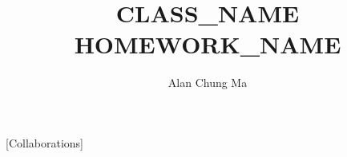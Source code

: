 \documentclass{article}
\title{CLASS_NAME HOMEWORK_NAME}
\author{Alan Chung Ma}
\date{}
\begin{document}
\maketitle

[Collaborations]
\end{document}
